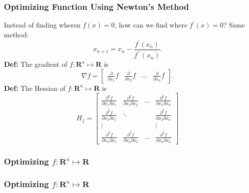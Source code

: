 \documentclass{beamer}
\newcommand{\RR}{\mathbf{R}}
\newcommand{\m}[1]{\begin{bmatrix} #1 \end{bmatrix}}
\newcommand{\pp}[2]{\frac{\partial^2 f}{\partial #1 \partial #2}}
\begin{document}
\begin{frame}
    \frametitle{Optimizing Function Using Newton's Method}
    Instead of finding wheren $f(x)=0$, how 
    can we find where $f^\prime(x)=0$? Same
    method:
    \[
        x_{n+1} = x_n - \frac{f^\prime(x_n)}{f^{\prime\prime}(x_n)}.
    \]
    \textbf{Def:} The gradient of $f: \RR^n \mapsto \RR$ is
    \[
        \nabla f = \m{\frac{\partial}{\partial x_1}f & \frac{\partial}{\partial x_2}f & \dots & \frac{\partial}{\partial x_n}f}.
    \]
    \textbf{Def:} The Hessian of $f: \RR^n \mapsto \RR$ is
    \[
        H_f = \m{\pp{x_1}{x_1}&\pp{x_1}{x_2}&\dots&\pp{x_1}{x_n}\\
                 \pp{x_2}{x_1}&\ddots&&\pp{x_2}{x_n}\\
        \vdots&&&\vdots\\
                 \pp{x_n}{x_1}&\pp{x_n}{x_2}&\dots&\pp{x_n}{x_n}}
    \]
\end{frame}

\begin{frame}
    \frametitle{Optimizing $f : \RR^n \mapsto \RR$}
\end{frame}

\begin{frame}
    \frametitle{Optimizing $f : \RR^n \mapsto \RR$}
\end{frame}
\end{document}
